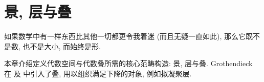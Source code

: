 \chapter{景, 层与叠}\label{src:3}
\begin{epigraph}
如果数学中有一样东西比其他一切都更令我着迷 (而且无疑一直如此), 那么它既不是数, 也不是大小, 而始终是形.
\end{epigraph}
本章介绍定义代数空间与代数叠所需的核心范畴构造: 景, 层与叠. Grothendieck 在 \cite[§A.1]{FGAI} 及 \cite[§6]{SGA1} 中引入了叠, 用以组织满足下降的对象, 例如拟凝聚层.

